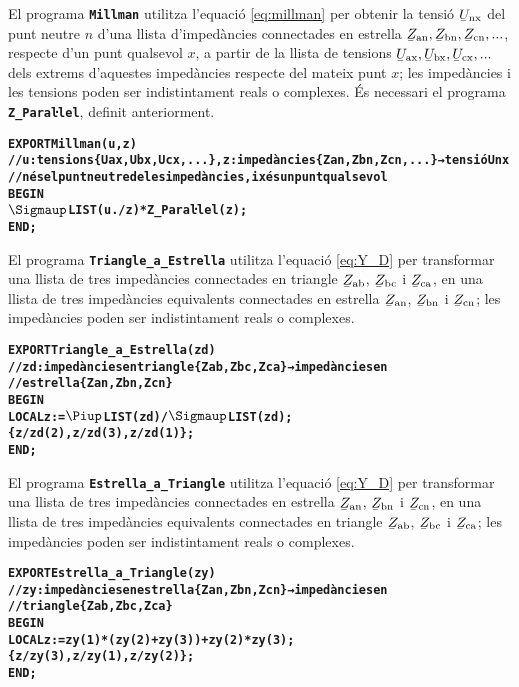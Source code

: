 El programa \texttt{\textbf{Millman}} utilitza l'equació \eqref{eq:millman} per obtenir la tensió $\cmplx{U}\ped{nx}$ del punt neutre $n$ d'una llista d'impedàncies connectades en estrella $\cmplx{Z}\ped{an}, \cmplx{Z}\ped{bn}, \cmplx{Z}\ped{cn}, ...$, respecte d'un punt qualsevol $x$, a partir de la llista de tensions $\cmplx{U}\ped{ax}, \cmplx{U}\ped{bx}, \cmplx{U}\ped{cx}, ...$ dels extrems d'aquestes impedàncies respecte del mateix punt $x$; les impedàncies i les tensions poden ser indistintament reals o complexes. És necessari el programa \texttt{\textbf{Z\_Paraŀlel}}, definit anteriorment.
\vspace{-6mm}
\begin{alltt}
\bfseries
{}
    EXPORT Millman(u,z)
    // u:tensions \{Uax,Ubx,Ucx,...\}, z:impedàncies \{Zan,Zbn,Zcn,...\} → tensió Unx
    // n és el punt neutre de les impedàncies, i x és un punt qualsevol
    BEGIN
      \(\Sigmaup\)LIST(u ./ z) * Z_Paraŀlel(z);
    END;
\end{alltt}


El programa \texttt{\textbf{Triangle\_a\_Estrella}} utilitza l'equació \eqref{eq:Y_D} per transformar una llista de tres impedàncies connectades en triangle $\cmplx{Z}\ped{ab}$, $\cmplx{Z}\ped{bc}$ i  $\cmplx{Z}\ped{ca}$, en una llista de tres impedàncies equivalents connectades en estrella $\cmplx{Z}\ped{an}$, $\cmplx{Z}\ped{bn}$ i $\cmplx{Z}\ped{cn}$; les impedàncies poden ser indistintament reals o complexes.
\vspace{-6mm}
\begin{alltt}
\bfseries
{}
    EXPORT Triangle_a_Estrella(zd)
    // zd:impedàncies en triangle \{Zab,Zbc,Zca\} → impedàncies en
    // estrella \{Zan,Zbn,Zcn\}
    BEGIN
      LOCAL z:=\(\Piup\)LIST(zd)/\(\Sigmaup\)LIST(zd);
      \{z/zd(2),z/zd(3),z/zd(1)\};
    END;
\end{alltt}

El programa \texttt{\textbf{Estrella\_a\_Triangle}} utilitza l'equació \eqref{eq:Y_D} per transformar una llista de tres impedàncies connectades en estrella $\cmplx{Z}\ped{an}$, $\cmplx{Z}\ped{bn}$ i $\cmplx{Z}\ped{cn}$, en una llista de tres impedàncies equivalents connectades en triangle $\cmplx{Z}\ped{ab}$, $\cmplx{Z}\ped{bc}$ i  $\cmplx{Z}\ped{ca}$; les impedàncies poden ser indistintament reals o complexes.
\vspace{-6mm}
\begin{alltt}
\bfseries
{}
    EXPORT Estrella_a_Triangle(zy)
    // zy:impedàncies en estrella \{Zan,Zbn,Zcn\} → impedàncies en
    // triangle \{Zab,Zbc,Zca\}
    BEGIN
      LOCAL z:=zy(1)*(zy(2)+zy(3))+zy(2)*zy(3);
      \{z/zy(3),z/zy(1),z/zy(2)\};
    END;
\end{alltt}

